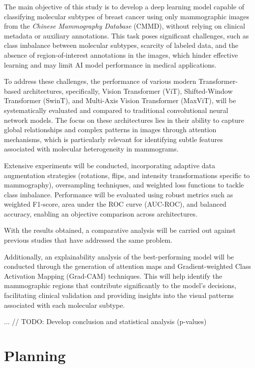 \documentclass[a4paper,10pt]{book}
\begin{document}
The main objective of this study is to develop a deep learning model capable of classifying molecular subtypes of breast cancer using only mammographic images from the \textit{Chinese Mammography Database} (CMMD), without relying on clinical metadata or auxiliary annotations. This task poses significant challenges, such as class imbalance between molecular subtypes, scarcity of labeled data, and the absence of region-of-interest annotations in the images, which hinder effective learning and may limit AI model performance in medical applications.

To address these challenges, the performance of various modern Transformer-based architectures, specifically, Vision Transformer (ViT), Shifted-Window Transformer (SwinT), and Multi-Axis Vision Transformer (MaxViT), will be systematically evaluated and compared to traditional convolutional neural network models. The focus on these architectures lies in their ability to capture global relationships and complex patterns in images through attention mechanisms, which is particularly relevant for identifying subtle features associated with molecular heterogeneity in mammograms.

Extensive experiments will be conducted, incorporating adaptive data augmentation strategies (rotations, flips, and intensity transformations specific to mammography), oversampling techniques, and weighted loss functions to tackle class imbalance. Performance will be evaluated using robust metrics such as weighted F1-score, area under the ROC curve (AUC-ROC), and balanced accuracy, enabling an objective comparison across architectures.

With the results obtained, a comparative analysis will be carried out against previous studies that have addressed the same problem.

Additionally, an explainability analysis of the best-performing model will be conducted through the generation of attention maps and Gradient-weighted Class Activation Mapping (Grad-CAM) techniques. This will help identify the mammographic regions that contribute significantly to the model's decisions, facilitating clinical validation and providing insights into the visual patterns associated with each molecular subtype.

... // TODO: Develop conclusion and statistical analysis (p-values)

\section{Planning}
\end{document}
